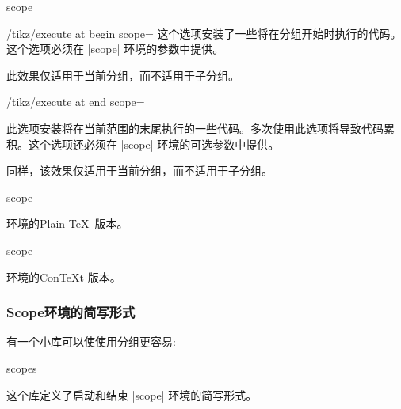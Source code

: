 \begin{environment}{{scope}}
\begin{key}{/tikz/execute at begin scope=}
        这个选项安装了一些将在分组开始时执行的代码。这个选项必须在 |{scope}| 环境的参数中提供。


        此效果仅适用于当前分组，而不适用于子分组。
    \end{key}

    \begin{key}{/tikz/execute at end scope=}

        此选项安装将在当前范围的末尾执行的一些代码。多次使用此选项将导致代码累积。这个选项还必须在 |{scope}| 环境的可选参数中提供。


        同样，该效果仅适用于当前分组，而不适用于子分组。
    \end{key}
\end{environment}

\begin{plainenvironment}{{scope}}

    环境的Plain \TeX\ 版本。
\end{plainenvironment}

\begin{contextenvironment}{{scope}}

    环境的Con\TeX t 版本。
\end{contextenvironment}


\subsubsection{Scope环境的简写形式}


有一个小库可以使使用分组更容易:
%
\begin{tikzlibrary}{scopes}

    这个库定义了启动和结束 |{scope}| 环境的简写形式。
\end{tikzlibrary}

